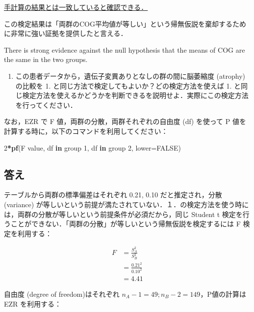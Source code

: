 \documentclass[11pt,]{problemset}
\newenvironment{Shaded}{\begin{snugshade}}{\end{snugshade}}
\newcommand{\ControlFlowTok}[1]{\textcolor[rgb]{0.13,0.29,0.53}{\textbf{#1}}}
\newcommand{\DataTypeTok}[1]{\textcolor[rgb]{0.13,0.29,0.53}{#1}}
\newcommand{\DecValTok}[1]{\textcolor[rgb]{0.00,0.00,0.81}{#1}}
\newcommand{\KeywordTok}[1]{\textcolor[rgb]{0.13,0.29,0.53}{\textbf{#1}}}
\newcommand{\NormalTok}[1]{#1}
\newcommand{\OperatorTok}[1]{\textcolor[rgb]{0.81,0.36,0.00}{\textbf{#1}}}
\newcommand{\OtherTok}[1]{\textcolor[rgb]{0.56,0.35,0.01}{#1}}
\providecommand{\tightlist}{%
  \setlength{\itemsep}{0pt}\setlength{\parskip}{0pt}}
\begin{document}
\underline{手計算の結果とは一致していると確認できる．}

この検定結果は「両群のCOG平均値が等しい」という帰無仮説を棄却するために非常に強い証拠を提供したと言える．

There is strong evidence against the null hypothesis that the means of
COG are the same in the two groups.

\newpage
\vfill

\begin{enumerate}
\def\labelenumi{\arabic{enumi}.}
\setcounter{enumi}{1}
\tightlist
\item
  この患者データから，遺伝子変異ありとなしの群の間に脳萎縮度 (atrophy)
  の比較を 1. と同じ方法で検定してもよいか？どの検定方法を使えば 1.
  と同じ検定方法を使えるかどうかを判断できるを説明せよ．実際にこの検定方法を行ってください．
\end{enumerate}

なお，EZR で F 値，両群の分散，両群それぞれの自由度 (df) を使って P
値を計算する時に，以下のコマンドを利用してください：

\begin{Shaded}
\begin{Highlighting}[]
\DecValTok{2}\OperatorTok{*}\KeywordTok{pf}\NormalTok{(F value, df }\ControlFlowTok{in}\NormalTok{ group }\DecValTok{1}\NormalTok{, df }\ControlFlowTok{in}\NormalTok{ group }\DecValTok{2}\NormalTok{, }\DataTypeTok{lower=}\OtherTok{FALSE}\NormalTok{)}
\end{Highlighting}
\end{Shaded}

\hypertarget{section-2}{%
\subsection{答え}\label{section-2}}

テーブルから両群の標準偏差はそれぞれ 0.21, 0.10 だと推定され，分散
(variance)
が等しいという前提が満たされていない．１．の検定方法を使う時には，両群の分散が等しいという前提条件が必須だから，同じ
Student t
検定を行うことができない．「両群の分散」が等しいという帰無仮説を検定するには
F 検定を利用する：

\[
\begin{aligned}
F & = \frac{S^2_A}{S^2_B} \\
  & = \frac{0.21^2}{0.10^2} \\
  & = 4.41
\end{aligned}
\]

自由度 (degree of freedom)はそれぞれ
\(n_A - 1 = 49; n_B -2 = 149\)，P値の計算は EZR を利用する：
\end{document}
